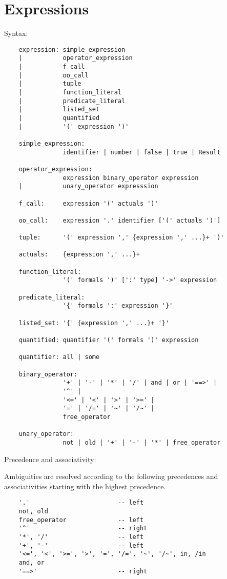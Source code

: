 \section{Expressions}

\noindent Syntax:
\begin{lstlisting}
    expression: simple_expression
    |           operator_expression
    |           f_call
    |           oo_call
    |           tuple
    |           function_literal
    |           predicate_literal
    |           listed_set
    |           quantified
    |           '(' expression ')'

    simple_expression:
                identifier | number | false | true | Result

    operator_expression:
                expression binary_operator expression
    |           unary_operator expresssion
    
    f_call:     expression '(' actuals ')'

    oo_call:    expression '.' identifier ['(' actuals ')']

    tuple:      '(' expression ',' {expression ',' ...}+ ')'

    actuals:    {expression ',' ...}+

    function_literal:
                '(' formals ')' [':' type] '->' expression
                   
    predicate_literal:
                '{' formals ':' expression '}'

    listed_set: '{' {expression ',' ...}+ '}'

    quantified: quantifier '(' formals ')' expression

    quantifier: all | some

    binary_operator:
                '+' | '-' | '*' | '/' | and | or | '==>' |
                '^' |
                '<=' | '<' | '>' | '>=' |
                '=' | '/=' | '~' | '/~' |
                free_operator

    unary_operator:
                not | old | '+' | '-' | '*' | free_operator
\end{lstlisting}

\noindent Precedence and associativity:

Ambiguities are resolved according to the following precedences and
associativities starting with the highest precedence.
\begin{lstlisting}
    '.'                        -- left
    not, old
    free_operator              -- left
    '^'                        -- right
    '*', '/'                   -- left
    '+', '-'                   -- left
    '<=', '<', '>=', '>', '=', '/=', '~', '/~', in, /in
    and, or
    '==>'                      -- right
\end{lstlisting}



